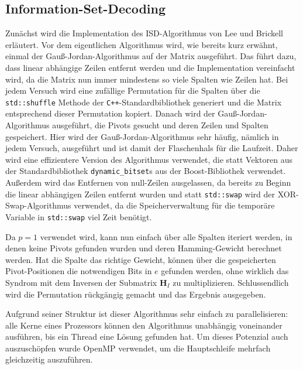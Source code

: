 \documentclass[a4paper,10pt,ngerman]{scrartcl}
\begin{document}
\subsection{Information-Set-Decoding}
Zunächst wird die Implementation des ISD-Algorithmus von Lee und Brickell erläutert.
Vor dem eigentlichen Algorithmus wird, wie bereits kurz erwähnt, einmal der Gauß-Jordan-Algorithmus auf der Matrix ausgeführt. 
Das führt dazu, dass linear abhängige Zeilen entfernt werden und die Implementation vereinfacht wird, da die Matrix nun immer mindestens so viele Spalten wie Zeilen hat.
Bei jedem Versuch wird eine zufällige Permutation für die Spalten über die \lstinline{std::shuffle} Methode der \texttt{C++}-Standardbibliothek generiert und die Matrix entsprechend dieser Permutation kopiert. 
Danach wird der Gauß-Jordan-Algorithmus ausgeführt, die Pivots gesucht und deren Zeilen und Spalten gespeichert. 
Hier wird der Gauß-Jordan-Algorithmus sehr häufig, nämlich in jedem Versuch, ausgeführt und ist damit der Flaschenhals für die Laufzeit. 
Daher wird eine effizientere Version des Algorithmus verwendet, die statt Vektoren aus der Standardbibliothek \lstinline{dynamic_bitset}s aus der Boost-Bibliothek verwendet.
Außerdem wird das Entfernen von null-Zeilen ausgelassen, da bereits zu Beginn die linear abhängigen Zeilen entfernt wurden und statt \lstinline{std::swap} wird der XOR-Swap-Algorithmus verwendet, da die Speicherverwaltung für die temporäre Variable in \lstinline{std::swap} viel Zeit benötigt.

Da $p=1$ verwendet wird, kann nun einfach über alle Spalten iteriert werden, in denen keine Pivots gefunden wurden und deren Hamming-Gewicht berechnet werden. 
Hat die Spalte das richtige Gewicht, können über die gespeicherten Pivot-Positionen die notwendigen Bits in $e$ gefunden werden, ohne wirklich das Syndrom mit dem Inversen der Submatrix $\mathbf{H}_I$ zu multiplizieren.
Schlussendlich wird die Permutation rückgängig gemacht und das Ergebnis ausgegeben. 

Aufgrund seiner Struktur ist dieser Algorithmus sehr einfach zu parallelisieren: alle Kerne eines Prozessors können den Algorithmus unabhängig voneinander ausführen, bis ein Thread eine Lösung gefunden hat.
Um dieses Potenzial auch auszuschöpfen wurde OpenMP verwendet, um die Hauptschleife mehrfach gleichzeitig auszuführen.
\end{document}
